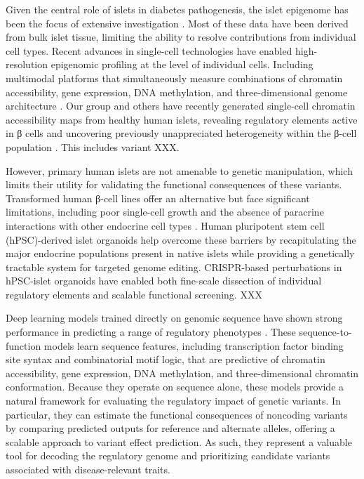 Given the central role of islets in diabetes pathogenesis, the islet epigenome has been the focus of extensive investigation {}. Most of these data have been derived from bulk islet tissue, limiting the ability to resolve contributions from individual cell types. Recent advances in single-cell technologies have enabled high-resolution epigenomic profiling at the level of individual cells. Including multimodal platforms that simultaneously measure combinations of chromatin accessibility, gene expression, DNA methylation, and three-dimensional genome architecture {}. Our group and others have recently generated single-cell chromatin accessibility maps from healthy human islets, revealing regulatory elements active in β cells and uncovering previously unappreciated heterogeneity within the β-cell population {}. This includes variant XXX.

However, primary human islets are not amenable to genetic manipulation, which limits their utility for validating the functional consequences of these variants. Transformed human β-cell lines offer an alternative but face significant limitations, including poor single-cell growth and the absence of paracrine interactions with other endocrine cell types {}. Human pluripotent stem cell (hPSC)-derived islet organoids help overcome these barriers by recapitulating the major endocrine populations present in native islets {} while providing a genetically tractable system for targeted genome editing. CRISPR-based perturbations in hPSC-islet organoids have enabled both fine-scale dissection of individual regulatory elements and scalable functional screening. XXX

Deep learning models trained directly on genomic sequence have shown strong performance in predicting a range of regulatory phenotypes {}. These sequence-to-function models learn sequence features, including transcription factor binding site syntax and combinatorial motif logic, that are predictive of chromatin accessibility{}, gene expression{}, DNA methylation{}, and three-dimensional chromatin conformation{}. Because they operate on sequence alone, these models provide a natural framework for evaluating the regulatory impact of genetic variants. In particular, they can estimate the functional consequences of noncoding variants by comparing predicted outputs for reference and alternate alleles, offering a scalable approach to variant effect prediction. As such, they represent a valuable tool for decoding the regulatory genome and prioritizing candidate variants associated with disease-relevant traits.


